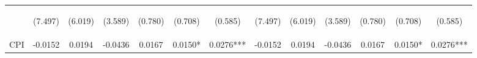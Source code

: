 \documentclass[]{article}
\begin{document}
\begin{center}
\begin{tabular}{lcccccccccccc}
\vspace{4pt} & \begin{footnotesize}(7.497)\end{footnotesize} & \begin{footnotesize}(6.019)\end{footnotesize} & \begin{footnotesize}(3.589)\end{footnotesize} & \begin{footnotesize}(0.780)\end{footnotesize} & \begin{footnotesize}(0.708)\end{footnotesize} & \begin{footnotesize}(0.585)\end{footnotesize} & \begin{footnotesize}(7.497)\end{footnotesize} & \begin{footnotesize}(6.019)\end{footnotesize} & \begin{footnotesize}(3.589)\end{footnotesize} & \begin{footnotesize}(0.780)\end{footnotesize} & \begin{footnotesize}(0.708)\end{footnotesize} & \begin{footnotesize}(0.585)\end{footnotesize} \\
CPI & -0.0152 & 0.0194 & -0.0436 & 0.0167 & 0.0150* & 0.0276*** & -0.0152 & 0.0194 & -0.0436 & 0.0167 & 0.0150* & 0.0276*** \\

\end{tabular}
\end{center}
\end{document}
